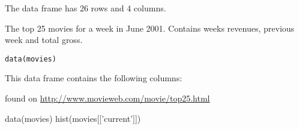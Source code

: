 \begin{Description}\relax
The  data frame has 26 rows and 4 columns.

The top 25 movies for a week in June 2001. Contains weeks revenues,
previous week  and
total gross.
\end{Description}
\begin{Usage}
\begin{verbatim}data(movies)\end{verbatim}
\end{Usage}
\begin{Format}\relax
This data frame contains the following columns:
\end{Format}
\begin{Source}\relax
found on \url{http://www.movieweb.com/movie/top25.html}
\end{Source}
\begin{Examples}
\begin{ExampleCode}
data(movies)
hist(movies[['current']])
\end{ExampleCode}
\end{Examples}

